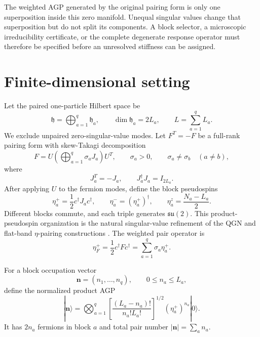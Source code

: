 \documentclass[11pt]{article}
\numberwithin{equation}{section}
\newcommand{\bn}{\mathbf n}
\begin{document}
The weighted AGP generated by the original pairing form is only one superposition inside this zero manifold.  Unequal singular values change that superposition but do not split its components.  A block selector, a microscopic irreducibility certificate, or the complete degenerate response operator must therefore be specified before an unresolved stiffness can be assigned.

\section{Finite-dimensional setting}

Let the paired one-particle Hilbert space be
\begin{equation}
 \mathfrak h=\bigoplus_{a=1}^q\mathfrak h_a,
 \qquad
 \dim\mathfrak h_a=2L_a,
 \qquad
 L=\sum_{a=1}^qL_a.
 \label{eq:h-decomp}
\end{equation}
We exclude unpaired zero-singular-value modes.  Let $F^T=-F$ be a full-rank pairing form with skew-Takagi decomposition
\begin{equation}
 F=U\left(\bigoplus_{a=1}^q \sigma_aJ_a\right)U^T,
 \qquad
 \sigma_a>0,
 \qquad
 \sigma_a\ne\sigma_b\quad(a\ne b),
 \label{eq:takagi}
\end{equation}
where
\begin{equation}
 J_a^T=-J_a,
 \qquad
 J_a^\dagger J_a=I_{2L_a}.
 \label{eq:Ja}
\end{equation}
After applying $U$ to the fermion modes, define the block pseudospins
\begin{equation}
 \eta_a^+=\frac12 c^\dagger J_ac^\dagger,
 \qquad
 \eta_a^-=(\eta_a^+)^\dagger,
 \qquad
 \eta_a^z=\frac{N_a-L_a}{2}.
 \label{eq:block-eta}
\end{equation}
Different blocks commute, and each triple generates $\mathfrak{su}(2)$.  This product-pseudospin organization is the natural singular-value refinement of the QGN and flat-band $\eta$-pairing constructions \cite{HanEtAl2024,TovmasyanEtAl2016}.  The weighted pair operator is
\begin{equation}
 \eta_F^+=\frac12c^\dagger Fc^\dagger
 =\sum_{a=1}^q\sigma_a\eta_a^+.
 \label{eq:weighted-eta}
\end{equation}

For a block occupation vector
\begin{equation}
 \bn=(n_1,\ldots,n_q),
 \qquad
 0\le n_a\le L_a,
 \label{eq:composition}
\end{equation}
define the normalized product AGP
\begin{equation}
 |\bn\rangle
 =\bigotimes_{a=1}^q
 \left[\frac{(L_a-n_a)!}{n_a!L_a!}\right]^{1/2}
 (\eta_a^+)^{n_a}|0\rangle.
 \label{eq:product-agp}
\end{equation}
It has $2n_a$ fermions in block $a$ and total pair number $|\bn|=\sum_an_a$.
\end{document}
